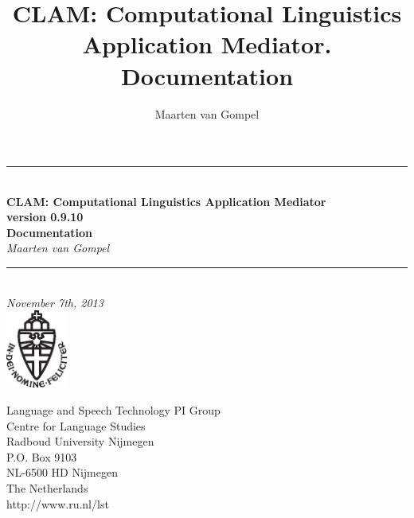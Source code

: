 \documentclass[a4paper,12pt]{report}
\author{Maarten van Gompel}
\title{CLAM: Computational Linguistics Application Mediator. Documentation}
\newcommand{\HRule}{\rule{\linewidth}{0.5mm}} %
\begin{document}
\sffamily

\begin{titlepage}
\begin{center}
\vspace{3cm}  %

\HRule \\[0.5cm]
{ \Large \bfseries CLAM: Computational Linguistics Application Mediator}\\[0.5cm] %
{\bf \small version 0.9.10} \\[0.5cm]
{ \Large \bfseries Documentation}\\[0.5cm]
{\large \emph{Maarten van Gompel}}\\[0.5cm]
\HRule \\[1.0cm]

\emph{November 7th, 2013} \\[0.5cm] 
\includegraphics[width=20.0mm]{ru-beeldmerk-zwart.eps}
\end{center}
\vspace{3cm} %

\begin{minipage}{0.6\textwidth}
\begin{flushleft}
Language and Speech Technology PI Group \\
Centre for Language Studies \\
Radboud University Nijmegen \\
P.O. Box 9103 \\
NL-6500 HD Nijmegen \\
The Netherlands \\
http://www.ru.nl/lst \\[0.3cm]
\end{flushleft}
\end{minipage}

\end{titlepage}
\tableofcontents
\end{document}
